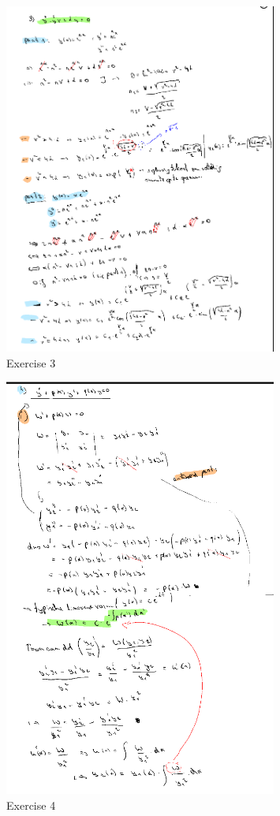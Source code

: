 \documentclass[a4paper]{report}
\begin{document}
\begin{figure}[H]
	\centering
	\includegraphics[width=0.8\textwidth]{assets/exercise_3_huis_8.png}
	\caption{Exercise 3}
	\label{fig:exercise_3_huis_8}
\end{figure}


\begin{figure}[H]
	\centering
	\includegraphics[width=0.8\textwidth]{assets/exercise_4_huis_8.png}
	\caption{Exercise 4}
	\label{fig:exercise_4_huis_8}
\end{figure}
\end{document}
